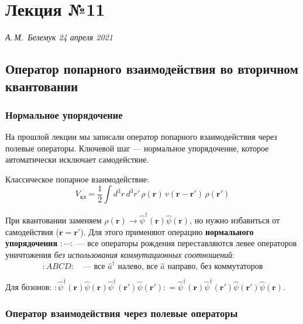 \documentclass[../general/general]{subfiles}
\begin{document}
\chapter{Лекция №11}
\noindent\textit{А.\,М.~Белемук \hfill 24 апреля 2021}
\vspace{1em}
\ifSubfilesClassLoaded{\tableofcontents\newpage}{}


\section{Оператор попарного взаимодействия во вторичном квантовании}

\subsection{Нормальное упорядочение}

На прошлой лекции мы записали оператор попарного взаимодействия через полевые операторы. Ключевой шаг --- нормальное упорядочение, которое автоматически исключает самодействие.

Классическое попарное взаимодействие:
\begin{equation}
    V_{\text{кл}} = \frac{1}{2}\int d^3r\,d^3r'\,\rho(\mathbf{r})\,v(\mathbf{r}-\mathbf{r}')\,\rho(\mathbf{r}')
\end{equation}

При квантовании заменяем $\rho(\mathbf{r}) \to \hat{\psi}^\dagger(\mathbf{r})\hat{\psi}(\mathbf{r})$, но нужно избавиться от самодействия ($\mathbf{r} = \mathbf{r}'$). Для этого применяют операцию \textbf{нормального упорядочения} $:\cdots:$ --- все операторы рождения переставляются левее операторов уничтожения \emph{без использования коммутационных соотношений}:
\begin{equation}
    :A B C D: \quad \text{--- все $\hat{a}^\dagger$ налево, все $\hat{a}$ направо, без коммутаторов}
\end{equation}

Для бозонов: $:\hat{\psi}^\dagger(\mathbf{r})\hat{\psi}(\mathbf{r})\hat{\psi}^\dagger(\mathbf{r}')\hat{\psi}(\mathbf{r}'): = \hat{\psi}^\dagger(\mathbf{r})\hat{\psi}^\dagger(\mathbf{r}')\hat{\psi}(\mathbf{r}')\hat{\psi}(\mathbf{r})$.

\subsection{Оператор взаимодействия через полевые операторы}
\end{document}

